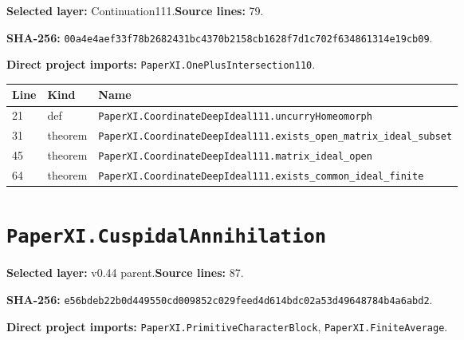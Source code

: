 \documentclass[10pt,oneside]{book}
\begin{document}
\textbf{Selected layer:} Continuation111.\quad\textbf{Source lines:} 79.\par\textbf{SHA-256:} {\scriptsize\nolinkurl{00a4e4aef33f78b2682431bc4370b2158cb1628f7d1c702f634861314e19cb09}}.


\textbf{Direct project imports:} \nolinkurl{PaperXI.OnePlusIntersection110}.

\begin{longtable}{@{}p{}p{}p{}@{}}\toprule Line&Kind&Name\\\midrule\endhead

21&def&\nolinkurl{PaperXI.CoordinateDeepIdeal111.uncurryHomeomorph}\\

31&theorem&\nolinkurl{PaperXI.CoordinateDeepIdeal111.exists_open_matrix_ideal_subset}\\

45&theorem&\nolinkurl{PaperXI.CoordinateDeepIdeal111.matrix_ideal_open}\\

64&theorem&\nolinkurl{PaperXI.CoordinateDeepIdeal111.exists_common_ideal_finite}\\

\bottomrule\end{longtable}

\section{\texorpdfstring{\nolinkurl{PaperXI.CuspidalAnnihilation}}{PaperXI.CuspidalAnnihilation}}\label{module:PaperXI.CuspidalAnnihilation}

\textbf{Selected layer:} v0.44 parent.\quad\textbf{Source lines:} 87.\par\textbf{SHA-256:} {\scriptsize\nolinkurl{e56bdeb22b0d449550cd009852c029feed4d614bdc02a53d49648784b4a6abd2}}.


\textbf{Direct project imports:} \nolinkurl{PaperXI.PrimitiveCharacterBlock}, \nolinkurl{PaperXI.FiniteAverage}.
\end{document}
